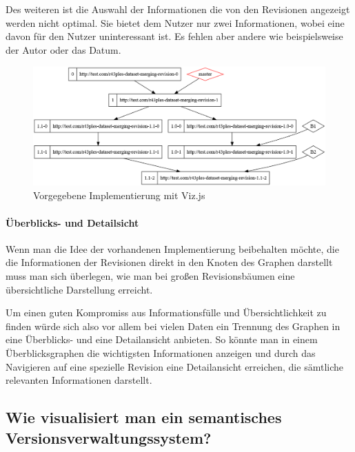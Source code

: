 \documentclass[color, ddc]{tudscrreprt}
\begin{document}
Des weiteren ist die Auswahl der Informationen die von den Revisionen angezeigt werden nicht optimal. Sie bietet dem Nutzer nur zwei Informationen, wobei eine davon für den Nutzer uninteressant ist. Es fehlen aber andere wie beispielsweise der Autor oder das Datum.

\begin{figure}[ht!]
\centering
\includegraphics[width=\textwidth]{Skizzen/vizjs.png}
\caption{Vorgegebene Implementierung mit Viz.js}
\end{figure}

\paragraph{Überblicks- und Detailsicht}\label{parag-2ansichten}

Wenn man die Idee der vorhandenen Implementierung beibehalten möchte, die die Informationen der Revisionen direkt in den Knoten des Graphen darstellt muss man sich überlegen, wie man bei großen Revisionsbäumen eine übersichtliche Darstellung erreicht.

Um einen guten Kompromiss aus Informationsfülle und Übersichtlichkeit zu finden würde sich also vor allem bei vielen Daten ein Trennung des Graphen in eine Überblicks- und eine Detailansicht anbieten. So könnte man in einem Überblicksgraphen die wichtigsten Informationen anzeigen und durch das Navigieren auf eine spezielle Revision eine Detailansicht erreichen, die sämtliche relevanten Informationen darstellt.

\subsection*{Wie visualisiert man ein semantisches Versionsverwaltungssystem?}

\end{document}
